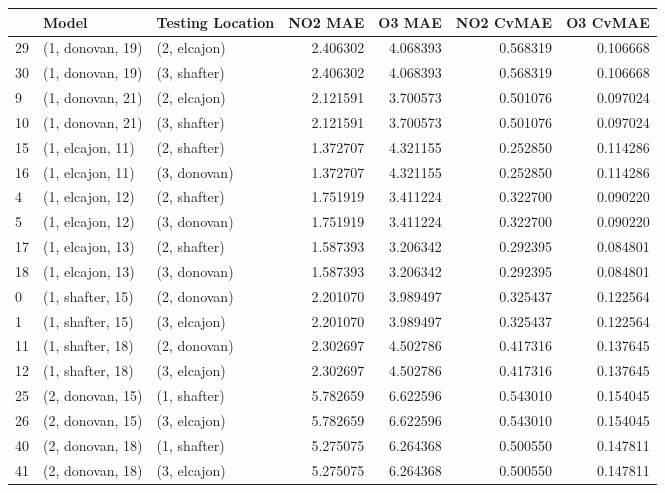 \begin{tabular}{lllrrrr}
\toprule
{} &             Model & Testing Location &   NO2 MAE &    O3 MAE &  NO2 CvMAE &  O3 CvMAE \\
\midrule
29 &  (1, donovan, 19) &     (2, elcajon) &  2.406302 &  4.068393 &   0.568319 &  0.106668 \\
30 &  (1, donovan, 19) &     (3, shafter) &  2.406302 &  4.068393 &   0.568319 &  0.106668 \\
9  &  (1, donovan, 21) &     (2, elcajon) &  2.121591 &  3.700573 &   0.501076 &  0.097024 \\
10 &  (1, donovan, 21) &     (3, shafter) &  2.121591 &  3.700573 &   0.501076 &  0.097024 \\
15 &  (1, elcajon, 11) &     (2, shafter) &  1.372707 &  4.321155 &   0.252850 &  0.114286 \\
16 &  (1, elcajon, 11) &     (3, donovan) &  1.372707 &  4.321155 &   0.252850 &  0.114286 \\
4  &  (1, elcajon, 12) &     (2, shafter) &  1.751919 &  3.411224 &   0.322700 &  0.090220 \\
5  &  (1, elcajon, 12) &     (3, donovan) &  1.751919 &  3.411224 &   0.322700 &  0.090220 \\
17 &  (1, elcajon, 13) &     (2, shafter) &  1.587393 &  3.206342 &   0.292395 &  0.084801 \\
18 &  (1, elcajon, 13) &     (3, donovan) &  1.587393 &  3.206342 &   0.292395 &  0.084801 \\
0  &  (1, shafter, 15) &     (2, donovan) &  2.201070 &  3.989497 &   0.325437 &  0.122564 \\
1  &  (1, shafter, 15) &     (3, elcajon) &  2.201070 &  3.989497 &   0.325437 &  0.122564 \\
11 &  (1, shafter, 18) &     (2, donovan) &  2.302697 &  4.502786 &   0.417316 &  0.137645 \\
12 &  (1, shafter, 18) &     (3, elcajon) &  2.302697 &  4.502786 &   0.417316 &  0.137645 \\
25 &  (2, donovan, 15) &     (1, shafter) &  5.782659 &  6.622596 &   0.543010 &  0.154045 \\
26 &  (2, donovan, 15) &     (3, elcajon) &  5.782659 &  6.622596 &   0.543010 &  0.154045 \\
40 &  (2, donovan, 18) &     (1, shafter) &  5.275075 &  6.264368 &   0.500550 &  0.147811 \\
41 &  (2, donovan, 18) &     (3, elcajon) &  5.275075 &  6.264368 &   0.500550 &  0.147811 \\

\end{tabular}
